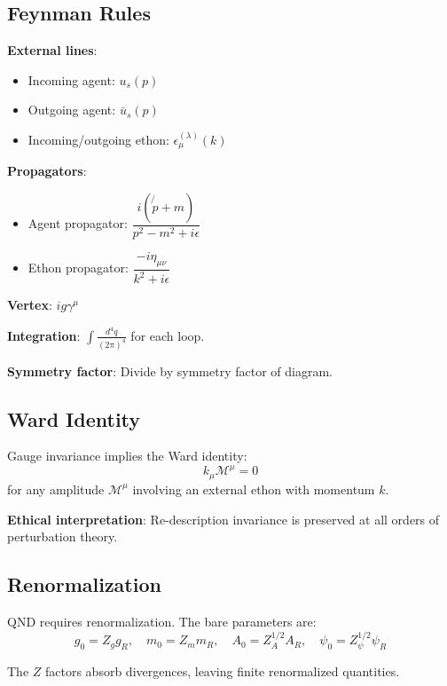 \documentclass[12pt]{article}
\begin{document}
\subsection{Feynman Rules}

\textbf{External lines}:
\begin{itemize}
    \item Incoming agent: $u_s(p)$
    \item Outgoing agent: $\bar{u}_s(p)$
    \item Incoming/outgoing ethon: $\epsilon_\mu^{(\lambda)}(k)$
\end{itemize}

\textbf{Propagators}:
\begin{itemize}
    \item Agent propagator: $\dfrac{i(\not{p} + m)}{p^2 - m^2 + i\epsilon}$
    \item Ethon propagator: $\dfrac{-i\eta_{\mu\nu}}{k^2 + i\epsilon}$
\end{itemize}

\textbf{Vertex}: $ig\gamma^\mu$

\textbf{Integration}: $\displaystyle\int \frac{d^4q}{(2\pi)^4}$ for each loop.

\textbf{Symmetry factor}: Divide by symmetry factor of diagram.

\subsection{Ward Identity}

Gauge invariance implies the Ward identity:
\begin{equation}
    k_\mu \mathcal{M}^\mu = 0
\end{equation}
for any amplitude $\mathcal{M}^\mu$ involving an external ethon with momentum $k$.

\textbf{Ethical interpretation}: Re-description invariance is preserved at all orders of perturbation theory.

\subsection{Renormalization}

QND requires renormalization. The bare parameters are:
\begin{equation}
    g_0 = Z_g g_R, \quad m_0 = Z_m m_R, \quad A_0 = Z_A^{1/2} A_R, \quad \psi_0 = Z_\psi^{1/2} \psi_R
\end{equation}

The $Z$ factors absorb divergences, leaving finite renormalized quantities.
\end{document}
